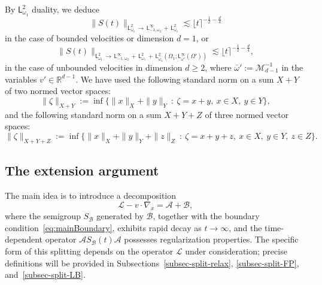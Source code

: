 \documentclass[11pt]{amsart}
\theoremstyle{definition}
\theoremstyle{remark}
\numberwithin{equation}{section}
\newcommand\R{{\mathbb R}}
\def\AA{{\mathcal A}}
\def\BB{{\mathcal B}}
\def\MMM{{\mathscr M}}
\newcommand{\sfL}{\mathsf{L}}
\newcommand{\wangle}[1]{\lfloor #1 \rceil}
\begin{document}
By $\sfL^2_{\omega_1}$ duality, we deduce
\begin{equation}
  \label{eq:SL2->Linfty}
  \| S(t) \|_{\sfL^{2}_{\omega_1} \, \to \, \sfL^{\infty}_{-1,\omega_2} \, + \, \sfL^{2}_{\omega_1}} \lesssim \wangle{t}^{-\frac12-\frac{d}4}
\end{equation}
in the case of bounded velocities or dimension $d=1$, or
\begin{equation}
  \label{eq:SL2->Xprim-bis}
  \| S(t) \|_{\sfL^{2}_{\omega_1} \, \to \, \sfL^{\infty}_{-1,\omega_2} \, + \, \sfL^{2}_{\omega_1} \, + \, \sfL^{2}_{\bar \omega_1}(\Omega_1 ;\sfL^{\infty}_{\bar \omega'}(\Omega'))}  \lesssim \wangle{t}^{-\frac12-\frac{d}4},
\end{equation}
in the case of unbounded velocities in dimension $d \ge 2$, where $\bar \omega':=\MMM_{d-1}^{-1}$ in the variables $v'\in \R^{d-1}$. We have used the following standard norm on a sum $X+Y$ of two normed vector spaces:
\begin{equation*}
  \|\zeta \|_{X+Y} := \inf \Big\{ \| x \|_X + \| y \|_Y  \ : \ \zeta=x+y, \ x \in X, \ y \in Y  \Big\},
\end{equation*}
and the following standard norm on a sum $X+Y+Z$ of three normed vector spaces:
\begin{equation*}
  \|\zeta \|_{X+Y+Z} := \inf \Big\{ \| x \|_X + \| y \|_Y + \| z \|_Z \ : \ \zeta=x+y+z, \ x \in X, \ y \in Y, \ z \in Z \Big\}.
\end{equation*}

\subsection{The extension argument}
\label{subsec:kin-pw-splitting}

The main idea is to introduce a decomposition
\begin{equation}
  \label{eq:splitting}
  \mathcal{L} - v \cdot \nabla_x = \mathcal{A} + \mathcal{B},
\end{equation}
where the semigroup $S_\BB$ generated by $\mathcal{B}$, together with the boundary condition~\eqref{eq:mainBoundary}, exhibits rapid decay as $t \to \infty$, and the time-dependent operator $\AA S_\BB(t) \AA$ possesses regularization properties. The specific form of this splitting depends on the operator $\mathcal{L}$ under consideration; precise definitions will be provided in Subsections~\ref{subsec-split-relax}, \ref{subsec-split-FP}, and~\ref{subsec-split-LB}.
\end{document}
